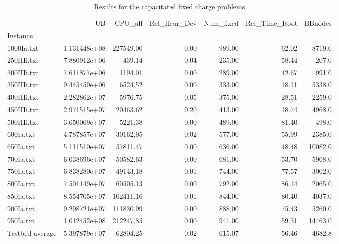 \begin{table}
\centering
\caption{Results for the capacitated fixed charge problems}
\begin{tabular}{lrrrrrr}
\toprule
{} &            UB &    CPU\_all &  Rel\_Heur\_Dev &  Num\_fixed &  Rel\_Time\_Root &  BBnodes \\
Instance        &               &            &               &            &                &          \\
\midrule
1000Ia.txt      &  1.131448e+08 &  227549.00 &          0.00 &     989.00 &          62.02 &   8719.0 \\
250IIIi.txt     &  7.880912e+06 &     439.14 &          0.04 &     235.00 &          58.44 &    207.0 \\
300IIIi.txt     &  7.611877e+06 &    1194.01 &          0.00 &     289.00 &          42.67 &    991.0 \\
350IIIi.txt     &  9.445459e+06 &    6524.52 &          0.00 &     333.00 &          18.11 &   5338.0 \\
400IIIi.txt     &  2.282862e+07 &    5976.75 &          0.05 &     375.00 &          28.51 &   2259.0 \\
450IIIi.txt     &  2.971515e+07 &   20463.62 &          0.20 &     413.00 &          18.74 &   4968.0 \\
500IIIi.txt     &  3.650069e+07 &    5221.38 &          0.00 &     489.00 &          81.40 &    498.0 \\
600Ia.txt       &  4.787857e+07 &   30162.95 &          0.02 &     577.00 &          55.99 &   2385.0 \\
650Ia.txt       &  5.111510e+07 &   57811.47 &          0.00 &     636.00 &          48.48 &  10082.0 \\
700Ia.txt       &  6.038696e+07 &   50582.63 &          0.00 &     681.00 &          53.70 &   5968.0 \\
750Ia.txt       &  6.838280e+07 &   49143.18 &          0.01 &     744.00 &          77.57 &   3002.0 \\
800Ia.txt       &  7.501149e+07 &   60505.13 &          0.00 &     792.00 &          86.14 &   2065.0 \\
850Ia.txt       &  8.554705e+07 &  102411.16 &          0.01 &     844.00 &          80.40 &   4037.0 \\
900Ia.txt       &  9.298721e+07 &  111830.99 &          0.00 &     888.00 &          75.43 &   5260.0 \\
950Ia.txt       &  1.012452e+08 &  212247.85 &          0.00 &     941.00 &          59.31 &  14463.0 \\
Testbed average &  5.397879e+07 &   62804.25 &          0.02 &     615.07 &          56.46 &   4682.8 \\
\bottomrule
\end{tabular}
\end{table}

